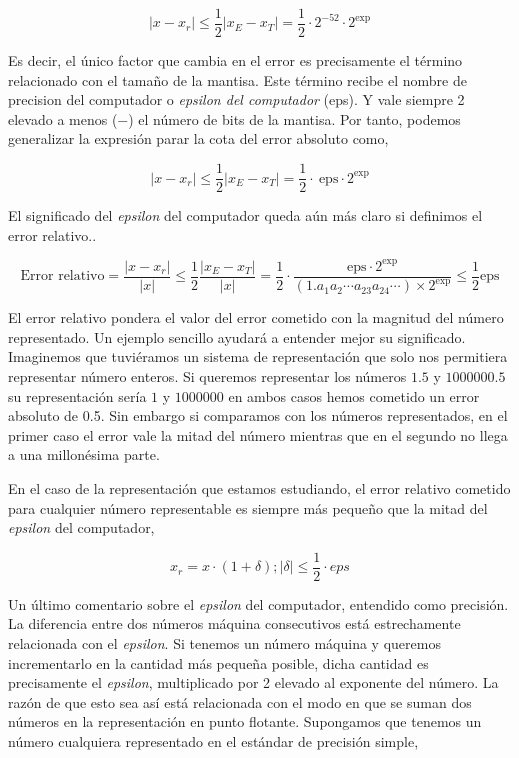  \begin{equation*}
\vert x-x_r \vert \leq \frac{1}{2}\vert x_E-x_T \vert= \frac{1}{2}\cdot 2^{-52}\cdot 2^\text{exp}
\end{equation*}
 
 Es decir, el único factor que cambia en el error es precisamente el término relacionado con el tamaño de la mantisa. Este término recibe el nombre de precision del computador o \emph{epsilon del computador} (eps). Y vale siempre 2 elevado a menos ($-$) el  número de bits de la mantisa. Por tanto, podemos generalizar la expresión parar la cota del error absoluto como,

  \begin{equation*}
\vert x-x_r \vert \leq \frac{1}{2}\vert x_E-x_T \vert= \frac{1}{2}\cdot\ \text{eps}\cdot2^\text{exp}
\end{equation*}

El significado del \emph{epsilon} del computador queda aún más claro si definimos el error relativo..

\begin{equation*}
\text{Error relativo}=\frac{\vert x-x_r \vert}{\vert x \vert} \leq \frac{1}{2}\frac{\vert x_E-x_T \vert}{\vert x \vert}= \frac{1}{2}\cdot \frac{\text{eps}\cdot2^\text{exp}}{(1.a_1a_2\cdots a_{23}a_{24}\cdots)\times2^{\text{exp}}}\leq \frac{1}{2}\text{eps}
\end{equation*}

El error relativo pondera el valor del error cometido con la magnitud del número representado.  Un ejemplo sencillo ayudará a entender mejor su significado. Imaginemos que tuviéramos un sistema de representación que solo nos permitiera representar número enteros. Si queremos representar los números $1.5$ y $1000000.5$ su representación sería $1$ y $1000000$ en ambos casos hemos cometido un error absoluto de 0.5. Sin embargo si comparamos con los números representados, en el primer caso el error vale la mitad del número mientras que en el segundo no llega a una millonésima parte.

En el caso de la representación que estamos estudiando, el error relativo cometido para cualquier número representable es siempre más pequeño que la mitad del \emph{epsilon} del computador,


\begin{equation*}
x_r=x\cdot (1+ \delta); | \delta| \leq \frac{1}{2}\cdot eps
\end{equation*}


Un último comentario sobre el \emph{epsilon} del computador, entendido como precisión. La diferencia entre dos números máquina consecutivos está estrechamente  relacionada con el \emph{epsilon}. Si tenemos un número máquina y queremos incrementarlo en la cantidad más pequeña posible, dicha cantidad es precisamente el \emph{epsilon}, multiplicado por 2 elevado al exponente del número. La razón de que esto sea así está relacionada con el modo en que se suman dos números en la representación en punto flotante. Supongamos que tenemos un número cualquiera representado en el estándar de precisión simple,

